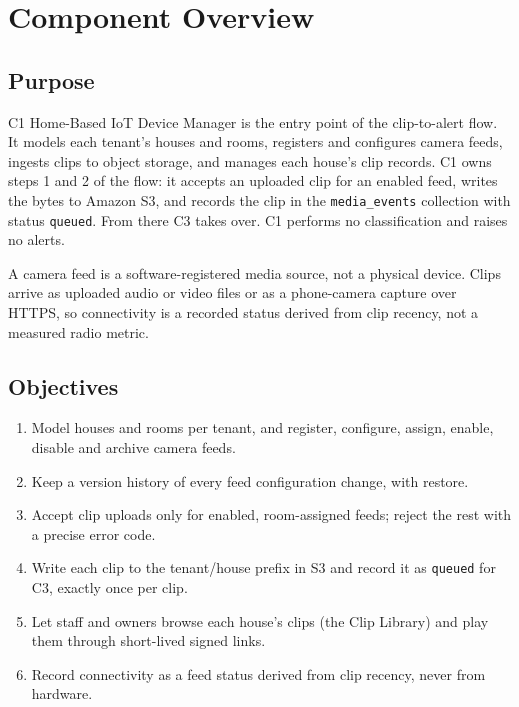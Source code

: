 \section{Component Overview}

\subsection{Purpose}
C1 Home-Based IoT Device Manager is the entry point of the clip-to-alert flow. It models each
tenant's houses and rooms, registers and configures camera feeds, ingests clips to object storage,
and manages each house's clip records. C1 owns steps 1 and 2 of the flow: it accepts an uploaded
clip for an enabled feed, writes the bytes to Amazon S3, and records the clip in the
\texttt{media\_events} collection with status \texttt{queued}. From there C3 takes over. C1 performs
no classification and raises no alerts.

A camera feed is a software-registered media source, not a physical device. Clips arrive as
uploaded audio or video files or as a phone-camera capture over HTTPS, so connectivity is a recorded
status derived from clip recency, not a measured radio metric.

\subsection{Objectives}
\begin{enumerate}
\item Model houses and rooms per tenant, and register, configure, assign, enable, disable and archive camera feeds.
\item Keep a version history of every feed configuration change, with restore.
\item Accept clip uploads only for enabled, room-assigned feeds; reject the rest with a precise error code.
\item Write each clip to the tenant/house prefix in S3 and record it as \texttt{queued} for C3, exactly once per clip.
\item Let staff and owners browse each house's clips (the Clip Library) and play them through short-lived signed links.
\item Record connectivity as a feed status derived from clip recency, never from hardware.
\end{enumerate}

